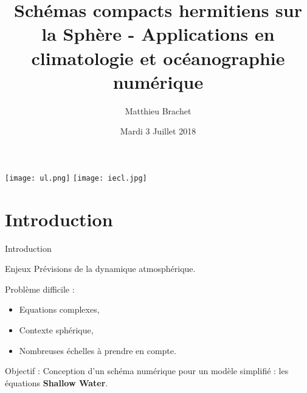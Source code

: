 \documentclass[11pt]{beamer}
\author[M. Brachet]{Matthieu Brachet}
\title[Soutenance de thèse]{Schémas compacts hermitiens sur la Sphère - Applications en climatologie et océanographie numérique}
\date[3-7-2018]{Mardi 3 Juillet 2018}
\begin{document}
\begin{frame}
\titlepage
\begin{flushright}
\texttt{[image: ul.png]}
\texttt{[image: iecl.jpg]}
\end{flushright}
\end{frame}


\begin{frame}
\tableofcontents
\end{frame}

\section{Introduction}
\begin{frame}{Introduction}
\begin{block}{Enjeux}
Prévisions de la dynamique atmosphérique.
\end{block}

\begin{alertblock}{}
Problème difficile :
\begin{itemize}
\item Equations complexes,
\item Contexte sphérique,
\item Nombreuses échelles à prendre en compte.
\end{itemize}
\end{alertblock}

\begin{exampleblock}{Objectif :}
Conception d'un schéma numérique pour un modèle simplifié : les équations \textbf{Shallow Water}.
\end{exampleblock}
\end{frame}
\end{document}

